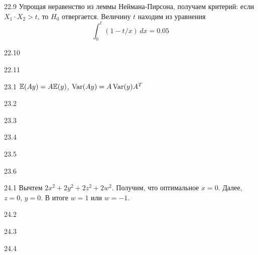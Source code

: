 \protect \hypertarget {soln:22.9}{}
\begin{solution}{{22.9}}
  Упрощая неравенство из леммы Неймана-Пирсона, получаем критерий: если $X_1\cdot X_2 >t$, то $H_0$ отвергается. Величину $t$ находим из уравнения
\[
\int_0^t (1 - t/x) \, dx = 0.05
\]
\end{solution}
\protect \hypertarget {soln:22.10}{}
\begin{solution}{{22.10}}

\end{solution}
\protect \hypertarget {soln:22.11}{}
\begin{solution}{{22.11}}
\end{solution}
\protect \hypertarget {soln:23.1}{}
\begin{solution}{{23.1}}
$\mathbb{E}(Ay)=A\mathbb{E}(y)$, $\operatorname{Var}(Ay)=A\operatorname{Var}(y)A^T$
\end{solution}
\protect \hypertarget {soln:23.2}{}
\begin{solution}{{23.2}}

\end{solution}
\protect \hypertarget {soln:23.3}{}
\begin{solution}{{23.3}}

\end{solution}
\protect \hypertarget {soln:23.4}{}
\begin{solution}{{23.4}}

\end{solution}
\protect \hypertarget {soln:23.5}{}
\begin{solution}{{23.5}}

\end{solution}
\protect \hypertarget {soln:23.6}{}
\begin{solution}{{23.6}}

\end{solution}
\protect \hypertarget {soln:24.1}{}
\begin{solution}{{24.1}}
Вычтем $2x^2 + 2y^2 + 2z^2 + 2w^2$. Получим, что оптимальное $x=0$. Далее, $z=0$, $y=0$. В итоге $w=1$ или $w=-1$.
\end{solution}
\protect \hypertarget {soln:24.2}{}
\begin{solution}{{24.2}}

\end{solution}
\protect \hypertarget {soln:24.3}{}
\begin{solution}{{24.3}}
\end{solution}
\protect \hypertarget {soln:24.4}{}
\begin{solution}{{24.4}}
\end{solution}

